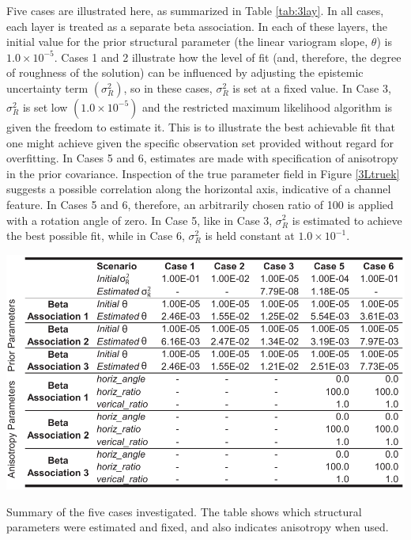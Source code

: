 \documentclass[11pt,oneside,onecolumn]{usgsreport}
\begin{document}
\begin{appendix}
Five cases are illustrated here, as summarized in Table \ref{tab:3lay}.
In all cases, each layer is treated as a separate beta association.
In each of these layers, the initial value for the prior structural
parameter (the linear variogram slope, $\theta$) is $1.0\times10^{-5}$.
Cases 1 and 2 illustrate how the level of fit (and, therefore, the
degree of roughness of the solution) can be influenced by adjusting
the epistemic uncertainty term $\left(\sigma_{R}^{2}\right)$, so
in these cases, $\sigma_{R}^{2}$ is set at a fixed value. In Case
3, $\sigma_{R}^{2}$ is set low $\left(1.0\times10^{-5}\right)$ and
the restricted maximum likelihood algorithm is given the freedom to
estimate it. This is to illustrate the best achievable fit that one
might achieve given the specific observation set provided without
regard for overfitting. In Cases 5 and 6, estimates are made with
specification of anisotropy in the prior covariance. Inspection of
the true parameter field in Figure \ref{3Ltruek} suggests a possible
correlation along the horizontal axis, indicative of a channel feature.
In Cases 5 and 6, therefore, an arbitrarily chosen ratio of 100 is
applied with a rotation angle of zero. In Case 5, like in Case 3,
$\sigma_{R}^{2}$ is estimated to achieve the best possible fit, while
in Case 6, $\sigma_{R}^{2}$ is held constant at $1.0\times10^{-1}.$

\begin{table}[H]
\begin{center}\includegraphics[scale=0.9]{tables/3_layer_tables_for_structural_parameters}\end{center}

\caption{\label{tab:3lay}Summary of the five cases investigated. The table
shows which structural parameters were estimated and fixed, and also
indicates anisotropy when used. }



\end{table}
\end{appendix}
\end{document}

